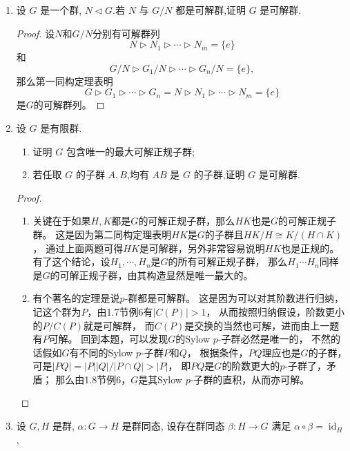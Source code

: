 \begin{enumerate}
\begin{proof}
    设可解群$G$有正规子群$N$和记号同上的可解群列，
    那么$G/N$可解是因为第一同构定理表明其有可解群列
    $G/N \triangleright G_1/N \triangleright\cdots\triangleright G_n/N$。
\end{proof}
\item 设 $G$ 是一个群, $N \triangleleft G$.若 $N$ 与 $G/N$ 都是可解群,证明 $G$ 是可解群.
\begin{proof}
    设$N$和$G/N$分别有可解群列
    \[N \triangleright N_1 \triangleright\cdots\triangleright N_m=\{e\}\]
    和
    \[G/N \triangleright G_1/N \triangleright\cdots\triangleright G_n/N=\{e\},\]
    那么第一同构定理表明
    \[G \triangleright G_1 \triangleright\cdots\triangleright G_n
    =N \triangleright N_1 \triangleright\cdots\triangleright N_m=\{e\}\]
    是$G$的可解群列。
\end{proof}
\item 设 $G$ 是有限群.
\begin{enumerate}[label=(\arabic*)]
\item 证明 $G$ 包含唯一的最大可解正规子群;
\item 若任取 $G$ 的子群 $A,B$,均有 $AB$ 是 $G$ 的子群,证明 $G$ 是可解群.
\end{enumerate}
\begin{proof}
    \begin{enumerate}[label=(\arabic*)]
    \item 关键在于如果$H,K$都是$G$的可解正规子群，那么$HK$也是$G$的可解正规子群。
    这是因为第二同构定理表明$HK$是$G$的子群且$HK/H \cong K/(H \cap K)$，
    通过上面两题可得$HK$是可解群，另外非常容易说明$HK$也是正规的。
    有了这个结论，设$H_1,\cdots,H_n$是$G$的所有可解正规子群，
    那么$H_1 \cdots H_n$同样是$G$的可解正规子群，由其构造显然是唯一最大的。
    \item 有个著名的定理是说$p$-群都是可解群。
    这是因为可以对其阶数进行归纳，记这个群为$P$，由1.7节例6有$|C(P)|>1$，
    从而按照归纳假设，阶数更小的$P/C(P)$就是可解群，
    而$C(P)$是交换的当然也可解，进而由上一题有$P$可解。
    回到本题，可以发现$G$的Sylow $p$-子群必然是唯一的，
    不然的话假如$G$有不同的Sylow $p$-子群$P$和$Q$，
    根据条件，$PQ$理应也是$G$的子群，可是$|PQ|=|P||Q|/|P \cap Q|>|P|$，
    即$PQ$是$G$的阶数更大的$p$-子群了，矛盾；
    那么由1.8节例6，$G$是其Sylow $p$-子群的直积，从而亦可解。\qedhere
\end{enumerate}
\end{proof}
\item 设 $G,H$ 是群, $\alpha : G \rightarrow H$ 是群同态,
设存在群同态 $\beta : H \rightarrow G$ 满足 $\alpha \circ \beta = \operatorname{id}_{H}$,

\end{enumerate}
